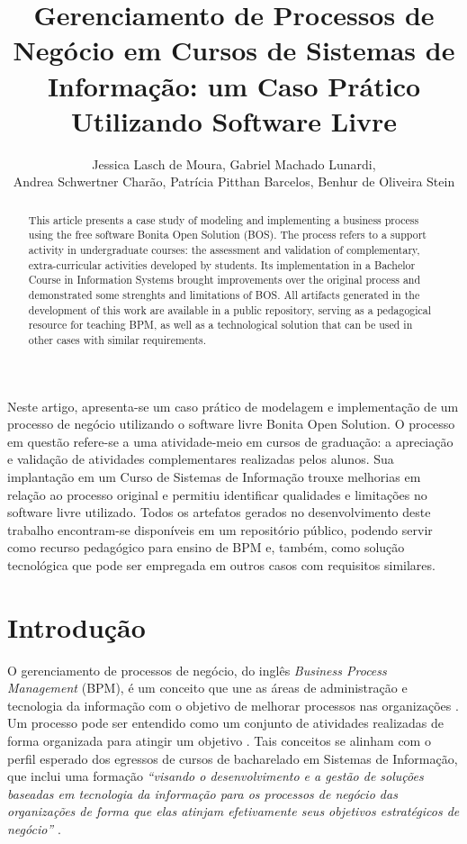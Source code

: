 \documentclass[12pt]{article}
\title{Gerenciamento de Processos de Negócio em Cursos de Sistemas de Informação: um Caso Prático\\ Utilizando Software Livre}
\author{Jessica Lasch de Moura\inst{1}, Gabriel Machado Lunardi\inst{1},\\
Andrea Schwertner Charão\inst{1}, Patrícia Pitthan Barcelos\inst{1}, Benhur de Oliveira Stein\inst{1}}
\begin{document}
\maketitle


\begin{resumo}
Neste artigo, apresenta-se um caso prático de modelagem e implementação de um processo de negócio utilizando o software livre Bonita Open Solution. O processo em questão refere-se a uma atividade-meio em cursos de graduação: a apreciação e validação de atividades complementares realizadas pelos alunos. Sua implantação em um Curso de Sistemas de Informação trouxe melhorias em relação ao processo original e permitiu identificar qualidades e limitações no software livre utilizado. Todos os artefatos gerados no desenvolvimento deste trabalho encontram-se disponíveis em um repositório público, podendo servir como recurso pedagógico para ensino de BPM e, também, como solução tecnológica que pode ser empregada em outros casos com requisitos similares.
\end{resumo}


\begin{abstract}
This article presents a case study of modeling and implementing a business process using the free software Bonita Open Solution (BOS). The process refers to a support activity in undergraduate courses: the assessment and validation of complementary, extra-curricular activities developed by students. Its implementation in a Bachelor Course in Information Systems brought improvements over the original process and demonstrated some strenghts and limitations of BOS. All artifacts generated in the development of this work are available in a public repository, serving as a pedagogical resource for teaching BPM, as well as a technological solution that can be used in other cases with similar requirements.
\end{abstract}


\section{Introdução}

O gerenciamento de processos de negócio, do inglês \emph{Business Process Management} (BPM), é um conceito que une as áreas de administração e tecnologia da informação com o objetivo de melhorar processos nas organizações \cite{weske}. Um processo pode ser entendido como um conjunto de atividades realizadas de forma organizada para atingir um objetivo \cite{ABPMP}. Tais conceitos se alinham com o perfil esperado dos egressos de cursos de bacharelado em Sistemas de Informação, que inclui uma formação \emph{“visando o desenvolvimento e a gestão de soluções baseadas em tecnologia da informação para os processos de negócio das organizações de forma que elas atinjam efetivamente seus objetivos estratégicos de negócio”} \cite{parecer:136}.
\end{document}
